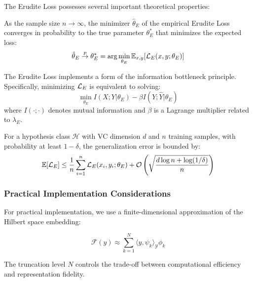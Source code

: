 The Erudite Loss possesses several important theoretical properties:

\begin{theorem}
As the sample size $n \to \infty$, the minimizer $\hat{\theta}_E$ of the empirical Erudite Loss converges in probability to the true parameter $\theta_E^*$ that minimizes the expected loss:
\begin{equation}
\hat{\theta}_E \stackrel{p}{\to} \theta_E^* = \arg\min_{\theta_E} \mathbb{E}_{x,y}[\mathcal{L}_E(x, y; \theta_E)]
\end{equation}
\end{theorem}

\begin{theorem}
The Erudite Loss implements a form of the information bottleneck principle. Specifically, minimizing $\mathcal{L}_E$ is equivalent to solving:
\begin{equation}
\min_{\theta_E} I(X;Y|\theta_E) - \beta I(Y;\hat{Y}|\theta_E)
\end{equation}
where $I(\cdot;\cdot)$ denotes mutual information and $\beta$ is a Lagrange multiplier related to $\lambda_E$.
\end{theorem}

\begin{theorem}
For a hypothesis class $\mathcal{H}$ with VC dimension $d$ and $n$ training samples, with probability at least $1-\delta$, the generalization error is bounded by:
\begin{equation}
\mathbb{E}[\mathcal{L}_E] \leq \frac{1}{n}\sum_{i=1}^n \mathcal{L}_E(x_i, y_i; \theta_E) + \mathcal{O}\left(\sqrt{\frac{d \log n + \log(1/\delta)}{n}}\right)
\end{equation}
\end{theorem}

\subsubsection{Practical Implementation Considerations}

For practical implementation, we use a finite-dimensional approximation of the Hilbert space embedding:

\begin{equation}
\mathcal{F}(y) \approx \sum_{k=1}^{N} \langle y, \psi_k \rangle_{\mathcal{Y}} \phi_k
\end{equation}

The truncation level $N$ controls the trade-off between computational efficiency and representation fidelity.

